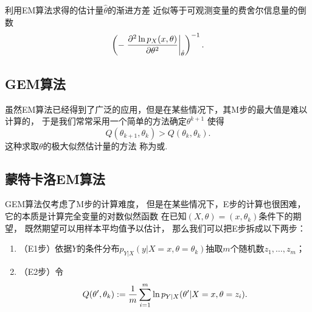 利用EM算法求得的估计量\(\hat{\theta}\)的渐进方差
近似等于可观测变量的费舍尔信息量的倒数\begin{equation*}
	\left( - \eval{ \pdv[2]{ \ln p_X(x,\theta) }{ \theta } }_{\hat{\theta}} \right)^{-1}.
\end{equation*}


\subsection{GEM算法}
虽然EM算法已经得到了广泛的应用，但是在某些情况下，其M步的最大值是难以计算的，
于是我们常常采用一个简单的方法确定\(\theta^{k+1}\)
使得\begin{equation*}
	Q(\theta_{k+1},\theta_k)
	> Q(\theta_k,\theta_k).
\end{equation*}
这种求取\(\theta\)的极大似然估计量的方法
称为或.

\subsection{蒙特卡洛EM算法}
GEM算法仅考虑了M步的计算难度，
但是在某些情况下，E步的计算也很困难，
它的本质是计算完全变量的对数似然函数
在已知\((X,\theta) = (x,\theta_k)\)条件下的期望，
既然期望可以用样本平均值予以估计，
那么我们可以把E步拆成以下两步：\begin{enumerate}
	\item （E1步）依据\(Y\)的条件分布\(p_{Y \vert X}(y \vert X=x, \theta=\theta_k)\)抽取\(m\)个随机数\(z_1,\dotsc,z_m\)；
	\item （E2步）令\begin{equation*}
		Q(\theta',\theta_k)
		:=
		\frac1m \sum_{i=1}^m \ln p_{Y \vert X}(\theta' \vert X=x, \theta=z_i).
	\end{equation*}
\end{enumerate}
